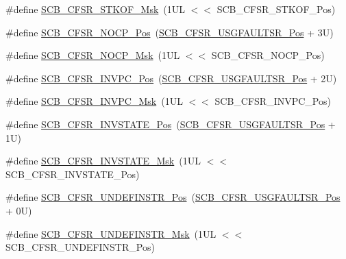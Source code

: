 \begin{DoxyCompactItemize}
\item 
\#define \mbox{\hyperlink{group___c_m_s_i_s___s_c_b_gae0b3bb3653d904169486e2d4efe4c566}{S\+C\+B\+\_\+\+C\+F\+S\+R\+\_\+\+S\+T\+K\+O\+F\+\_\+\+Msk}}~(1\+U\+L $<$$<$ S\+C\+B\+\_\+\+C\+F\+S\+R\+\_\+\+S\+T\+K\+O\+F\+\_\+\+Pos)
\item 
\#define \mbox{\hyperlink{group___c_m_s_i_s___s_c_b_ga769b841a38d4e7b8c5e7e74cf0455754}{S\+C\+B\+\_\+\+C\+F\+S\+R\+\_\+\+N\+O\+C\+P\+\_\+\+Pos}}~(\mbox{\hyperlink{group___c_m_s_i_s___s_c_b_gac8e4197b295c8560e68e2d71285c7879}{S\+C\+B\+\_\+\+C\+F\+S\+R\+\_\+\+U\+S\+G\+F\+A\+U\+L\+T\+S\+R\+\_\+\+Pos}} + 3\+U)
\item 
\#define \mbox{\hyperlink{group___c_m_s_i_s___s_c_b_ga6cbafe22a9550ca20427cd7e2f2bed7f}{S\+C\+B\+\_\+\+C\+F\+S\+R\+\_\+\+N\+O\+C\+P\+\_\+\+Msk}}~(1\+U\+L $<$$<$ S\+C\+B\+\_\+\+C\+F\+S\+R\+\_\+\+N\+O\+C\+P\+\_\+\+Pos)
\item 
\#define \mbox{\hyperlink{group___c_m_s_i_s___s_c_b_ga526d3cebe0e96962941e5e3a729307c2}{S\+C\+B\+\_\+\+C\+F\+S\+R\+\_\+\+I\+N\+V\+P\+C\+\_\+\+Pos}}~(\mbox{\hyperlink{group___c_m_s_i_s___s_c_b_gac8e4197b295c8560e68e2d71285c7879}{S\+C\+B\+\_\+\+C\+F\+S\+R\+\_\+\+U\+S\+G\+F\+A\+U\+L\+T\+S\+R\+\_\+\+Pos}} + 2\+U)
\item 
\#define \mbox{\hyperlink{group___c_m_s_i_s___s_c_b_gafd7f0192bfedbde5d313fe7e637f55f1}{S\+C\+B\+\_\+\+C\+F\+S\+R\+\_\+\+I\+N\+V\+P\+C\+\_\+\+Msk}}~(1\+U\+L $<$$<$ S\+C\+B\+\_\+\+C\+F\+S\+R\+\_\+\+I\+N\+V\+P\+C\+\_\+\+Pos)
\item 
\#define \mbox{\hyperlink{group___c_m_s_i_s___s_c_b_ga85ecc14a387d790129e9a3fb1312407a}{S\+C\+B\+\_\+\+C\+F\+S\+R\+\_\+\+I\+N\+V\+S\+T\+A\+T\+E\+\_\+\+Pos}}~(\mbox{\hyperlink{group___c_m_s_i_s___s_c_b_gac8e4197b295c8560e68e2d71285c7879}{S\+C\+B\+\_\+\+C\+F\+S\+R\+\_\+\+U\+S\+G\+F\+A\+U\+L\+T\+S\+R\+\_\+\+Pos}} + 1\+U)
\item 
\#define \mbox{\hyperlink{group___c_m_s_i_s___s_c_b_ga8088a459ac3900a43a54f5cd4252484d}{S\+C\+B\+\_\+\+C\+F\+S\+R\+\_\+\+I\+N\+V\+S\+T\+A\+T\+E\+\_\+\+Msk}}~(1\+U\+L $<$$<$ S\+C\+B\+\_\+\+C\+F\+S\+R\+\_\+\+I\+N\+V\+S\+T\+A\+T\+E\+\_\+\+Pos)
\item 
\#define \mbox{\hyperlink{group___c_m_s_i_s___s_c_b_ga28219a6a1ae6b6118ffd1682c362c63d}{S\+C\+B\+\_\+\+C\+F\+S\+R\+\_\+\+U\+N\+D\+E\+F\+I\+N\+S\+T\+R\+\_\+\+Pos}}~(\mbox{\hyperlink{group___c_m_s_i_s___s_c_b_gac8e4197b295c8560e68e2d71285c7879}{S\+C\+B\+\_\+\+C\+F\+S\+R\+\_\+\+U\+S\+G\+F\+A\+U\+L\+T\+S\+R\+\_\+\+Pos}} + 0\+U)
\item 
\#define \mbox{\hyperlink{group___c_m_s_i_s___s_c_b_ga96e201c8da2bd76df35e184f31b89f1e}{S\+C\+B\+\_\+\+C\+F\+S\+R\+\_\+\+U\+N\+D\+E\+F\+I\+N\+S\+T\+R\+\_\+\+Msk}}~(1\+U\+L $<$$<$ S\+C\+B\+\_\+\+C\+F\+S\+R\+\_\+\+U\+N\+D\+E\+F\+I\+N\+S\+T\+R\+\_\+\+Pos)
$$
\end{DoxyCompactItemize}

